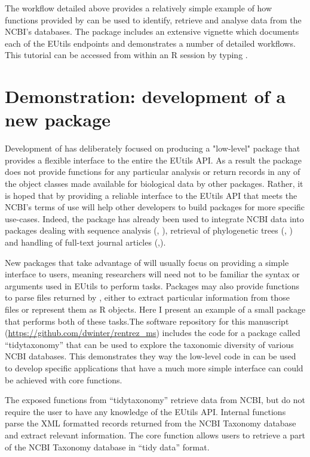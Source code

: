 The workflow detailed above provides a relatively simple example of how functions
provided by  can be used to identify, retrieve and analyse data
from the NCBI's databases. The package includes an extensive vignette which
documents each of the EUtils endpoints and demonstrates a number of detailed
workflows. This tutorial can be accessed from within an R session by typing 
.

\section{Demonstration: development of a new package}

Development of  has deliberately focused on producing a "low-level"
package that provides a flexible interface to the entire the EUtils API. As a 
result the package does not provide functions for any particular analysis
or return records in any of the object classes made available for biological
data by other packages. Rather, it is hoped that by providing a reliable interface
to the EUtils API that meets the NCBI's terms of use  will help 
other developers to build packages for more specific use-cases. Indeed, the
package has already been used to integrate NCBI data into packages dealing
with sequence analysis (, \citealt{genbankr}), retrieval of
phylogenetic trees (, \citealt{rotl}) and handling of
full-text journal articles (,\citealt{fulltext}).

New packages that take advantage of  will usually focus on
providing a simple interface to users, meaning researchers will need not to be
familiar the syntax or arguments used in EUtils to perform tasks. Packages may
also provide functions to parse files returned by , either
to extract particular information from those files or represent them as R 
objects. Here I present an example of a small package that performs both of
these tasks.The software repository for this manuscript
(\url{https://github.com/dwinter/rentrez_ms}) includes the code for a package 
called ``tidytaxonomy'' that can be used to explore the taxonomic
diversity of various NCBI databases. This demonstrates they way the 
low-level code in  can be used to develop specific applications 
that have a much more simple interface can could be achieved with core 
 functions.

The exposed functions from ``tidytaxonomy'' retrieve data from NCBI, but do not
require the user to have any knowledge of the EUtils API. Internal functions
parse the XML formatted records returned from the NCBI Taxonomy database and
extract relevant information. The core function  allows 
users to retrieve a part of the NCBI  Taxonomy database in ``tidy data'' 
\citep{tidy-data} format.

